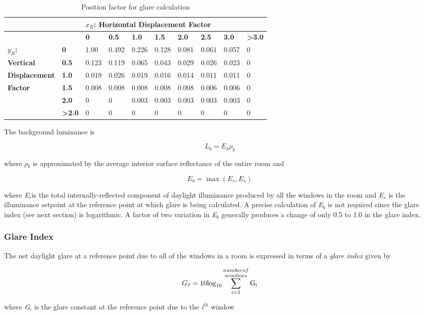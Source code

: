 \begin{longtable}[c]{p{1.0in}p{0.4in}p{0.4in}p{0.4in}p{0.4in}p{0.4in}p{0.4in}p{0.4in}p{0.4in}p{0.4in}}
\caption{Position factor for glare calculation \label{table:position-factor-for-glare-calculation}}\\
\toprule 
            &      &\multicolumn{8}{l}{$x_R$: Horizontal Displacement Factor} \tabularnewline \cmidrule(r){2-9} \endhead
            &      & \textbf{0}     & \textbf{0.5}   & \textbf{1.0}   & \textbf{1.5}   & \textbf{2.0}   & \textbf{2.5}   & \textbf{3.0}   & \textbf{>3.0} \tabularnewline
\textbf{$y_R$:}      & \textbf{0}    & 1.00  & 0.492 & 0.226 & 0.128 & 0.081 & 0.061 & 0.057 & 0 \tabularnewline
\textbf{Vertical}    & \textbf{0.5}  & 0.123 & 0.119 & 0.065 & 0.043 & 0.029 & 0.026 & 0.023 & 0 \tabularnewline
\textbf{Displacement}  & \textbf{1.0}  & 0.019 & 0.026 & 0.019 & 0.016 & 0.014 & 0.011 & 0.011 & 0 \tabularnewline
\textbf{Factor}      & \textbf{1.5}  & 0.008 & 0.008 & 0.008 & 0.008 & 0.008 & 0.006 & 0.006 & 0 \tabularnewline
            & \textbf{2.0}  & 0     & 0     & 0.003 & 0.003 & 0.003 & 0.003 & 0.003 & 0 \tabularnewline
            & \textbf{>2.0} & 0     & 0     & 0     & 0     & 0     & 0     & 0     & 0 \tabularnewline
\bottomrule
\end{longtable}

The background luminance is

\begin{equation}
{L_b} = {E_b}{\rho_b}
\end{equation}

where \emph{$\rho$\(_{b}\)} is approximated by the average interior surface reflectance of the entire room and

\begin{equation}
{E_b} = \max ({E_r},{E_s})
\end{equation}

where \emph{E\(_{r}\)}is the total internally-reflected component of daylight illuminance produced by all the windows in the room and \emph{E\(_{s}\)} is the illuminance setpoint at the reference point at which glare is being calculated. A precise calculation of \emph{E\(_{b}\)} is not required since the glare index (see next section) is logarithmic. A factor of two variation in \emph{E\(_{b}\)} generally produces a change of only 0.5 to 1.0 in the glare index.

\subsubsection{Glare Index}\label{glare-index}

The net daylight glare at a reference point due to all of the windows in a room is expressed in terms of a \emph{glare index} given by

\begin{equation}
{G_I} = 10{\log_{10}}\sum\limits_{i = 1}^{\scriptstyle \substack{number of \\ windows}} {{{\rm{G}}_{\rm{i}}}}
\end{equation}

where \emph{G\(_{i}\)} is the glare constant at the reference point due to the \emph{i\(^{th}\)} window

